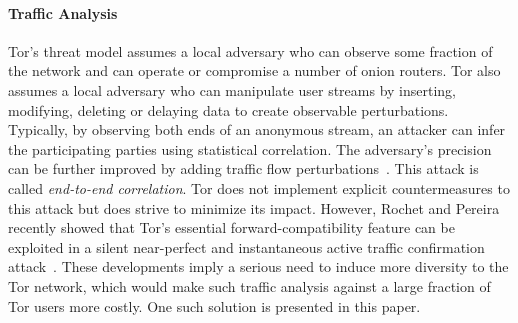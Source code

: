 

\paragraph*{Traffic Analysis}
Tor's threat model assumes a local adversary who can observe some fraction of
the network and can operate or compromise a number of onion routers. Tor also
assumes a local adversary who can manipulate user streams by inserting,
modifying, deleting or delaying data to create observable
perturbations. Typically, by observing both ends of an anonymous stream, an
attacker can infer the participating parties using statistical correlation. The
adversary's precision can be further improved by adding traffic flow
perturbations~\cite{fu2009one}. This attack is called \textit{end-to-end correlation}. Tor does
not implement explicit countermeasures to this attack but does strive to
minimize its impact. However, Rochet and Pereira recently showed that Tor's
essential forward-compatibility feature can be exploited in a silent
near-perfect and instantaneous active traffic confirmation
attack~\cite{rochet2018dropping}. These developments imply a serious need to
induce more diversity to the Tor network, which would make such traffic analysis
against a large fraction of Tor users more costly. One such solution is
presented in this paper.

